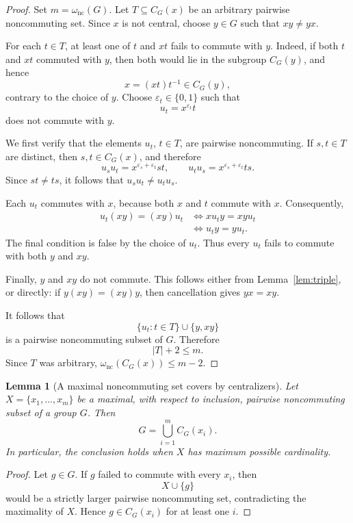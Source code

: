 \documentclass[11pt]{article}
\newtheorem{lemma}[theorem]{Lemma}
\theoremstyle{definition}
\newcommand{\nc}{\omega_{\mathrm{nc}}}
\begin{document}
\begin{proof}
Set $m=\nc(G)$.  Let $T\subseteq C_G(x)$ be an arbitrary pairwise noncommuting set.  Since $x$ is not central, choose $y\in G$ such that $xy\ne yx$.

For each $t\in T$, at least one of $t$ and $xt$ fails to commute with $y$.  Indeed, if both $t$ and $xt$ commuted with $y$, then both would lie in the subgroup $C_G(y)$, and hence
\[
 x=(xt)t^{-1}\in C_G(y),
\]
contrary to the choice of $y$.  Choose $\varepsilon_t\in\{0,1\}$ such that
\[
 u_t=x^{\varepsilon_t}t
\]
does not commute with $y$.

We first verify that the elements $u_t$, $t\in T$, are pairwise noncommuting.  If $s,t\in T$ are distinct, then $s,t\in C_G(x)$, and therefore
\[
 u_su_t=x^{\varepsilon_s+\varepsilon_t}st,
 \qquad
 u_tu_s=x^{\varepsilon_s+\varepsilon_t}ts.
\]
Since $st\ne ts$, it follows that $u_su_t\ne u_tu_s$.

Each $u_t$ commutes with $x$, because both $x$ and $t$ commute with $x$.  Consequently,
\begin{align*}
 u_t(xy)=(xy)u_t
 &\iff xu_ty=xyu_t\\
 &\iff u_ty=yu_t.
\end{align*}
The final condition is false by the choice of $u_t$.  Thus every $u_t$ fails to commute with both $y$ and $xy$.

Finally, $y$ and $xy$ do not commute.  This follows either from Lemma~\ref{lem:triple}, or directly: if $y(xy)=(xy)y$, then cancellation gives $yx=xy$.

It follows that
\[
 \{u_t:t\in T\}\cup\{y,xy\}
\]
is a pairwise noncommuting subset of $G$.  Therefore
\[
 |T|+2\le m.
\]
Since $T$ was arbitrary, $\nc(C_G(x))\le m-2$.
\end{proof}

\begin{lemma}[A maximal noncommuting set covers by centralizers]\label{lem:centralizer-cover}
Let $X=\{x_1,\dots,x_m\}$ be a maximal, with respect to inclusion, pairwise noncommuting subset of a group $G$.  Then
\[
 G=\bigcup_{i=1}^m C_G(x_i).
\]
In particular, the conclusion holds when $X$ has maximum possible cardinality.
\end{lemma}

\begin{proof}
Let $g\in G$.  If $g$ failed to commute with every $x_i$, then
\[
 X\cup\{g\}
\]
would be a strictly larger pairwise noncommuting set, contradicting the maximality of $X$.  Hence $g\in C_G(x_i)$ for at least one $i$.
\end{proof}
\end{document}
